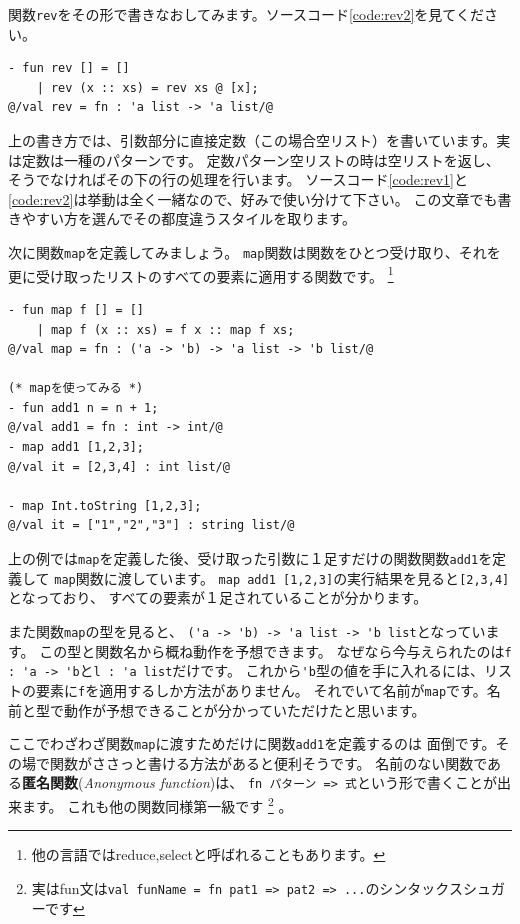 \documentclass[11pt,a4paper]{article}
\begin{document}
関数\lstinline{rev}をその形で書きなおしてみます。ソースコード\ref{code:rev2}を見てください。

\begin{lstlisting}[caption=引数部分でのパターンマッチ,label=code:rev2]
- fun rev [] = []
    | rev (x :: xs) = rev xs @ [x];
@/val rev = fn : 'a list -> 'a list/@
\end{lstlisting}

上の書き方では、引数部分に直接定数（この場合空リスト）を書いています。実は定数は一種のパターンです。
定数パターン空リストの時は空リストを返し、そうでなければその下の行の処理を行います。
ソースコード\ref{code:rev1}と\ref{code:rev2}は挙動は全く一緒なので、好みで使い分けて下さい。
この文章でも書きやすい方を選んでその都度違うスタイルを取ります。

次に関数\lstinline{map}を定義してみましょう。
\lstinline{map}関数は関数をひとつ受け取り、それを更に受け取ったリストのすべての要素に適用する関数です。
\footnote{他の言語ではreduce,selectと呼ばれることもあります。}

\begin{lstlisting}[caption=関数fとリストlを受け取り、lの要素全てにfを適用する関数, label=code:map]
- fun map f [] = []
    | map f (x :: xs) = f x :: map f xs;
@/val map = fn : ('a -> 'b) -> 'a list -> 'b list/@

(* mapを使ってみる *)
- fun add1 n = n + 1;
@/val add1 = fn : int -> int/@
- map add1 [1,2,3];
@/val it = [2,3,4] : int list/@

- map Int.toString [1,2,3];
@/val it = ["1","2","3"] : string list/@
\end{lstlisting}

上の例では\lstinline{map}を定義した後、受け取った引数に１足すだけの関数関数\lstinline{add1}を定義して
\lstinline{map}関数に渡しています。
\lstinline{map add1 [1,2,3]}の実行結果を見ると\lstinline{[2,3,4]}となっており、
すべての要素が１足されていることが分かります。

また関数\lstinline{map}の型を見ると、
\lstinline{('a -> 'b) -> 'a list -> 'b list}となっています。
この型と関数名から概ね動作を予想できます。
なぜなら今与えられたのは\lstinline{f : 'a -> 'b}と\lstinline{l : 'a list}だけです。
これから\lstinline{'b}型の値を手に入れるには、リストの要素に\lstinline{f}を適用するしか方法がありません。
それでいて名前が\lstinline{map}です。名前と型で動作が予想できることが分かっていただけたと思います。

ここでわざわざ関数\lstinline{map}に渡すためだけに関数\lstinline{add1}を定義するのは
面倒です。その場で関数がささっと書ける方法があると便利そうです。
名前のない関数である{\bfseries 匿名関数}({\itshape Anonymous function})は、
\lstinline{fn パターン => 式}という形で書くことが出来ます。
これも他の関数同様第一級です
\footnote{実はfun文は\lstinline{val funName = fn pat1 => pat2 => ...}のシンタックスシュガーです}
。
\end{document}
